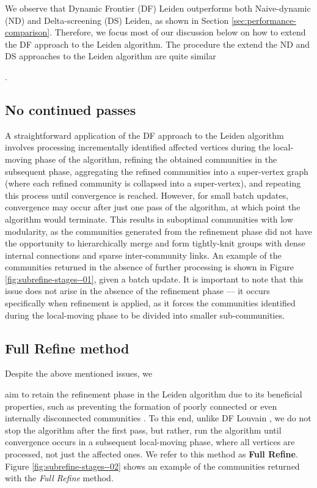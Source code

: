 We observe that Dynamic Frontier (DF) Leiden outperforms both Naive-dynamic (ND) and Delta-screening (DS) Leiden, as shown in Section \ref{sec:performance-comparison}. Therefore, we focus most of our discussion below on how to extend the DF approach to the Leiden algorithm. The procedure the extend the ND and DS approaches to the Leiden algorithm are quite similar.




\subsection{No continued passes}
\label{sec:no-continued-passes}

A straightforward application of the DF approach to the Leiden algorithm involves processing incrementally identified affected vertices during the local-moving phase of the algorithm, refining the obtained communities in the subsequent phase, aggregating the refined communities into a super-vertex graph (where each refined community is collapsed into a super-vertex), and repeating this process until convergence is reached. However, for small batch updates, convergence may occur after just one pass of the algorithm, at which point the algorithm would terminate. This results in suboptimal communities with low modularity, as the communities generated from the refinement phase did not have the opportunity to hierarchically merge and form tightly-knit groups with dense internal connections and sparse inter-community links. An example of the communities returned in the absence of further processing is shown in Figure \ref{fig:subrefine-stages--01}, given a batch update. It is important to note that this issue does not arise in the absence of the refinement phase --- it occurs specifically when refinement is applied, as it forces the communities identified during the local-moving phase to be divided into smaller sub-communities. 






\subsection{Full Refine method}
\label{sec:full-refine-method}

Despite the above mentioned issues, we aim to retain the refinement phase in the Leiden algorithm due to its beneficial properties, such as preventing the formation of poorly connected or even internally disconnected communities \cite{com-traag19}. To this end, unlike DF Louvain \cite{sahu2024shared}, we do not stop the algorithm after the first pass, but rather, run the algorithm until convergence occurs in a subsequent local-moving phase, where all vertices are processed, not just the affected ones. We refer to this method as \textbf{Full Refine}. Figure \ref{fig:subrefine-stages--02} shows an example of the communities returned with the \textit{Full Refine} method.




